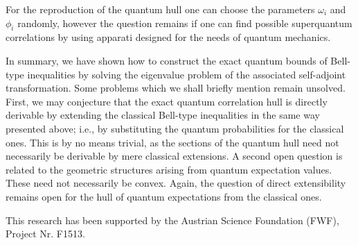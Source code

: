 \documentclass[prl,showpacs,showkeys,amsfonts,amsmath,twocolumn]{revtex4}
\begin{document}
For the reproduction of the quantum hull one can choose the parameters
$\omega_i$ and $\phi_i$ randomly, however the question remains if one can find possible
superquantum correlations by using apparati designed for the needs of
quantum mechanics.


In summary, we have shown how to construct the exact quantum bounds of
Bell-type inequalities
by solving the eigenvalue problem of the associated self-adjoint
transformation.
Some problems which we shall briefly mention remain unsolved. First, we may conjecture that the exact quantum correlation hull is directly derivable by extending the
classical Bell-type
inequalities in the same way presented above;
i.e., by substituting the quantum probabilities for the classical ones. This is by no means trivial, as the sections of the quantum hull need not necessarily be derivable by mere classical extensions. A second open question is related to the geometric structures arising from quantum expectation values. These need not necessarily be convex. Again, the question of direct extensibility remains open for the hull of
quantum expectations
from the classical ones.

This research has been supported by the Austrian Science Foundation (FWF),
Project Nr. F1513.




\end{document}
